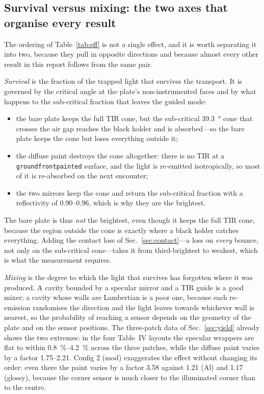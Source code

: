 \documentclass[11pt,a4paper]{article}
\begin{document}
\subsection{Survival versus mixing: the two axes that organise every result}
\label{sec:mechanism}

The ordering of Table~\ref{tab:eff} is not a single effect, and it is worth
separating it into two, because they pull in opposite directions and because
almost every other result in this report follows from the same pair.

\emph{Survival} is the fraction of the trapped light that survives the
transport. It is governed by the critical angle at the plate's non-instrumented
faces and by what happens to the sub-critical fraction that leaves the guided
mode:
\begin{itemize}
  \item the bare plate keeps the full TIR cone, but the sub-critical
        \SI{39.3}{\degree} cone that crosses the air gap reaches the black
        holder and is absorbed---so the bare plate keeps the cone but loses
        everything outside it;
  \item the diffuse paint destroys the cone altogether: there is no TIR at a
        \texttt{groundfrontpainted} surface, and the light is re-emitted
        isotropically, so most of it is re-absorbed on the next encounter;
  \item the two mirrors keep the cone and return the sub-critical fraction
        with a reflectivity of \num{0.90}--\num{0.96}, which is why they are
        the brightest.
\end{itemize}
The bare plate is thus \emph{not} the brightest, even though it keeps the full
TIR cone, because the region outside the cone is exactly where a black holder
catches everything. Adding the contact loss of Sec.~\ref{sec:contact}---a loss
on \emph{every} bounce, not only on the sub-critical cone---takes it from
third-brightest to weakest, which is what the measurement requires.

\emph{Mixing} is the degree to which the light that survives has forgotten
where it was produced. A cavity bounded by a specular mirror and a TIR guide
is a good mixer; a cavity whose walls are Lambertian is a poor one, because
each re-emission randomises the direction and the light leaves towards
whichever wall is nearest, so the probability of reaching a sensor depends on
the geometry of the plate and on the sensor positions. The three-patch data of
Sec.~\ref{sec:yield} already shows the two extremes: in the four Table~IV
layouts the specular wrappers are flat to within
\SIrange{0.8}{4.2}{\percent} across the three patches, while the diffuse paint
varies by a factor \num{1.75}--\num{2.21}. Config 2 (mod) exaggerates the
effect without changing its order: even there the paint varies by a factor
\num{3.58} against \num{1.21} (Al) and \num{1.17} (glossy), because the
corner sensor is much closer to the illuminated corner than to the centre.
\end{document}
